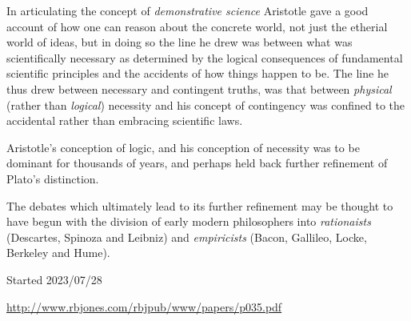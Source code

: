 \documentclass[10pt,titlepage]{book}
\begin{document}
In articulating the concept of \emph{demonstrative science} Aristotle gave a good account of how one can reason about the concrete world, not just the etherial world of ideas, but in doing so the line he drew was between what was scientifically necessary as determined by the logical consequences of fundamental scientific principles and the accidents of how things happen to be.
The line he thus drew between necessary and contingent truths, was that between \emph{physical} (rather than \emph{logical}) necessity and his concept of contingency was confined to the accidental rather than embracing scientific laws.

Aristotle's conception of logic, and his conception of necessity was to be dominant for thousands of years, and perhaps held back further refinement of Plato's distinction.

The debates which ultimately lead to its further refinement may be thought to have begun with the division of early modern philosophers into \emph{rationaists} (Descartes, Spinoza and Leibniz) and \emph{empiricists} (Bacon, Gallileo, Locke, Berkeley and Hume).

\pagebreak
{}
{}





\tiny{
Started 2023/07/28

\href{http://www.rbjones.com/rbjpub/www/papers/p034.pdf}{http://www.rbjones.com/rbjpub/www/papers/p035.pdf}

}%
\end{document}
